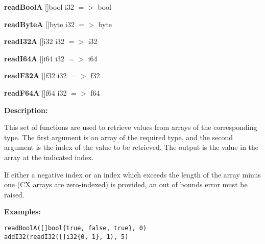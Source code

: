 \textbf{readBoolA} []bool i32 $=>$ bool

\textbf{readByteA} []byte i32 $=>$ byte

\textbf{readI32A} []i32 i32 $=>$ i32

\textbf{readI64A} []i64 i32 $=>$ i64

\textbf{readF32A} []f32 i32 $=>$ f32

\textbf{readF64A} []f64 i32 $=>$ f64

\textbf{Description:}

This set of functions are used to retrieve values from arrays of the
corresponding type. The first argument is an array of the required
type, and the second argument is the index of the value to be
retrieved. The output is the value in the array at the indicated
index.

If either a negative index or an index which exceeds the length of the
array minus one (CX arrays are zero-indexed) is provided, an out of
bounds error must be raised.

\textbf{Examples:}

\begin{lstlisting}
readBoolA([]bool{true, false, true}, 0)
addI32(readI32([]i32{0, 1}, 1), 5)
\end{lstlisting}


